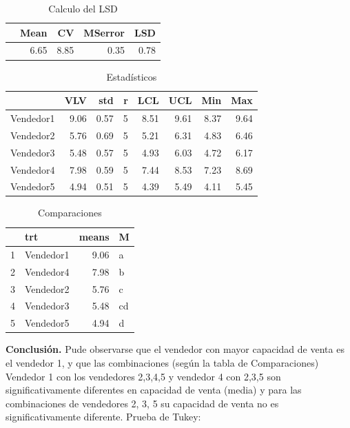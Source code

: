 \documentclass[12pt,letterpaper]{report}
\begin{document}
\begin{table}[ht]
\centering
\begin{tabular}{rrrrr}
  \hline
 & Mean & CV & MSerror & LSD \\ 
  \hline
  & 6.65 & 8.85 & 0.35 & 0.78 \\ 
   \hline
\end{tabular}
\caption{Calculo del LSD}
\end{table}

\begin{table}[ht]
\centering
\begin{tabular}{rrrrrrrr}
  \hline
 & VLV & std & r & LCL & UCL & Min & Max \\ 
  \hline
Vendedor1 & 9.06 & 0.57 &   5 & 8.51 & 9.61 & 8.37 & 9.64 \\ 
  Vendedor2 & 5.76 & 0.69 &   5 & 5.21 & 6.31 & 4.83 & 6.46 \\ 
  Vendedor3 & 5.48 & 0.57 &   5 & 4.93 & 6.03 & 4.72 & 6.17 \\ 
  Vendedor4 & 7.98 & 0.59 &   5 & 7.44 & 8.53 & 7.23 & 8.69 \\ 
  Vendedor5 & 4.94 & 0.51 &   5 & 4.39 & 5.49 & 4.11 & 5.45 \\ 
   \hline
\end{tabular}
\caption{Estadísticos}
\end{table}

\begin{table}[ht]
\centering
\begin{tabular}{rlrl}
  \hline
 & trt & means & M \\ 
  \hline
  1 & Vendedor1 & 9.06 & a \\ 
  2 & Vendedor4 & 7.98 & b \\ 
  3 & Vendedor2 & 5.76 & c \\ 
  4 & Vendedor3 & 5.48 & cd \\ 
  5 & Vendedor5 & 4.94 & d \\ 
   \hline
\end{tabular}
\caption{Comparaciones}
\end{table}
\newpage
\textbf{Conclusión.}
Pude observarse que el vendedor con mayor capacidad de venta es el vendedor 1, y que las combinaciones (según la tabla de Comparaciones) Vendedor 1 con los vendedores 2,3,4,5 y vendedor 4 con 2,3,5 son significativamente diferentes en capacidad de venta (media) y para las combinaciones de vendedores 2, 3, 5 su capacidad de venta no es significativamente diferente.
\newpage
Prueba de Tukey: 
\begin{Schunk}
\end{Schunk}
\end{document}
